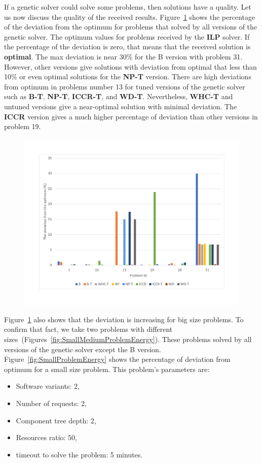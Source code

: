 If a genetic solver could solve some problems, then solutions have a quality.
Let us now discuss the quality of the received results. Figure~\ref{fig:EnergyPercentage} shows the percentage of the deviation from the optimum for problems that solved by all versions of the genetic solver. The optimum values for problems received by the \textbf{ILP} solver. If the percentage of the deviation is zero, that means that the received solution is \textbf{optimal}. The max deviation is near 30\% for the B version with problem 31. However, other versions give solutions with deviation from optimal that less than 10\% or even optimal solutions for the \textbf{NP-T} version. There are high deviations from optimum in problems number 13 for tuned versions of the genetic solver such as \textbf{B-T}, \textbf{NP-T}, \textbf{ICCR-T}, and \textbf{WD-T}. Nevertheless, \textbf{WHC-T} and untuned versions give a near-optimal solution with minimal deviation. The \textbf{ICCR} version gives a much higher percentage of deviation than other versions in problem 19.

\begin{figure}
	\centering
	\includegraphics[width=\textwidth]{images/EnergyPercentage.pdf}
	\caption[]{}
	\label{fig:EnergyPercentage}
\end{figure}

Figure~\ref{fig:EnergyPercentage} also shows that the deviation is increasing for big size problems. To confirm that fact, we take two problems with different sizes~(Figures~\ref{fig:SmallMediumProblemEnergy}). These problems solved by all versions of the genetic solver except the B version. Figure~\ref{fig:SmallProblemEnergy} shows the percentage of deviation from optimum for a small size problem. This problem's parameters are:
\begin{itemize}
	\item Software variants: 2,
	\item Number of requests: 2,
	\item Component tree depth: 2,
	\item Resources ratio: 50,
	\item timeout to solve the problem: 5 minutes.
\end{itemize}

